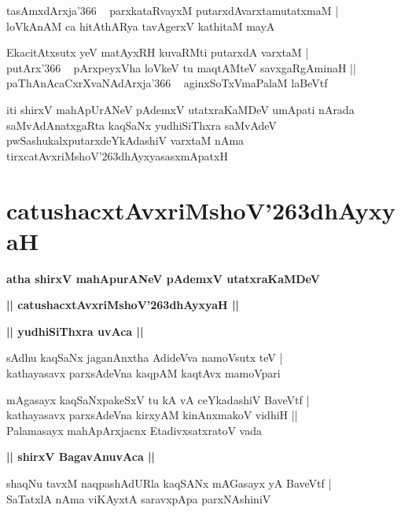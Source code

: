 \documentclass[twoside,12pt,openright]{book}
\def\S{\char'263}
\newcounter{shloka}[chapter]
\def\uvaca#1{\centerline{{\large\textbf{#1}}}}
\begin{document}
\begin{shloka}%
tasAmxdArxja\char'366 ~ parxkataRvayxM putarxdAvarxtamutatxmaM |\\
loVkAnAM ca hitAthARya tavAgerxV kathitaM mayA 
\end{shloka}

\begin{shloka}%
EkacitAtxsutx yeV matAyxRH kuvaRMti putarxdA varxtaM |\\
putArx\char'366 ~ pArxpeyxVha loVkeV tu maqtAMteV savxgaRgAminaH ||\\
paThAnAcaCxrXvaNAdArxja\char'366 ~ aginxSoTxVmaPalaM laBeVtf
\end{shloka}

\begin{center}
iti shirxV mahApUrANeV pAdemxV utatxraKaMDeV umApati nArada saMvAdAnatxgaRta kaqSaNx yudhiSiThxra 
saMvAdeV pwSashukalxputarxdeYkAdashiV varxtaM nAma tirxcatAvxriMshoV\S dhAyxyasasxmApatxH
\end{center}

\chapter{catushacxtAvxriMshoV\S dhAyxyaH}

\begin{center}
{\LARGE\bfseries atha shirxV mahApurANeV pAdemxV utatxraKaMDeV}
\end{center}

\begin{center}
{\LARGE\bfseries || catushacxtAvxriMshoV\S dhAyxyaH ||}
\end{center}

\uvaca{|| yudhiSiThxra uvAca ||}

\begin{shloka}%
sAdhu kaqSaNx jaganAnxtha AdideVva namoVsutx teV |\\
kathayasavx parxsAdeVna kaqpAM kaqtAvx mamoVpari 
\end{shloka}

\begin{shloka}%
mAgasayx kaqSaNxpakeSxV tu kA vA ceYkadashiV BaveVtf |\\
kathayasavx parxsAdeVna kirxyAM kinAnxmakoV vidhiH ||\\
Palamasayx mahApArxjacnx EtadivxsatxratoV vada
\end{shloka}

\uvaca{|| shirxV BagavAnuvAca ||}

\begin{shloka}%
shaqNu tavxM naqpashAdURla kaqSANx mAGasayx yA BaveVtf |\\
SaTatxlA nAma viKAyxtA saravxpApa parxNAshiniV
\end{shloka}
\end{document}
